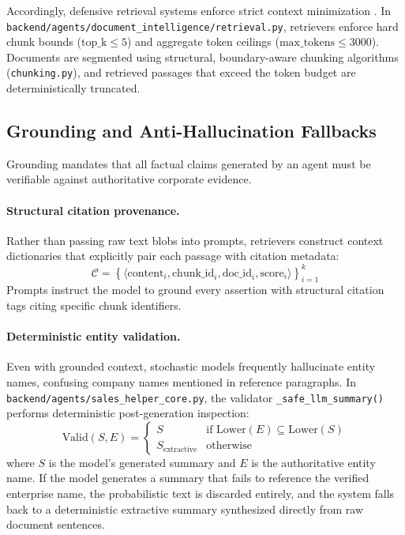 \documentclass[10pt,a4paper,twocolumn]{article}
\begin{document}
Accordingly, defensive retrieval systems enforce strict context minimization \cite{beurerkellner2025patterns}. In \texttt{backend/agents/document_intelligence/retrieval.py}, retrievers enforce hard chunk bounds ($\text{top\_k} \le 5$) and aggregate token ceilings ($\text{max\_tokens} \le 3000$). Documents are segmented using structural, boundary-aware chunking algorithms (\texttt{chunking.py}), and retrieved passages that exceed the token budget are deterministically truncated.

\subsection{Grounding and Anti-Hallucination Fallbacks}
Grounding mandates that all factual claims generated by an agent must be verifiable against authoritative corporate evidence. 

\paragraph{Structural citation provenance.} Rather than passing raw text blobs into prompts, retrievers construct context dictionaries that explicitly pair each passage with citation metadata:
\begin{equation}
\mathcal{C} = \left\{ \langle \text{content}_i, \text{chunk\_id}_i, \text{doc\_id}_i, \text{score}_i \rangle \right\}_{i=1}^{k}
\end{equation}
Prompts instruct the model to ground every assertion with structural citation tags citing specific chunk identifiers.

\paragraph{Deterministic entity validation.} Even with grounded context, stochastic models frequently hallucinate entity names, confusing company names mentioned in reference paragraphs. In \texttt{backend/agents/sales_helper_core.py}, the validator \texttt{\_safe\_llm\_summary()} performs deterministic post-generation inspection:
\begin{equation}
\text{Valid}(S, E) = \begin{cases}
S & \text{if } \text{Lower}(E) \subseteq \text{Lower}(S) \\
S_{\text{extractive}} & \text{otherwise}
\end{cases}
\end{equation}
where $S$ is the model's generated summary and $E$ is the authoritative entity name. If the model generates a summary that fails to reference the verified enterprise name, the probabilistic text is discarded entirely, and the system falls back to a deterministic extractive summary synthesized directly from raw document sentences.
\end{document}
